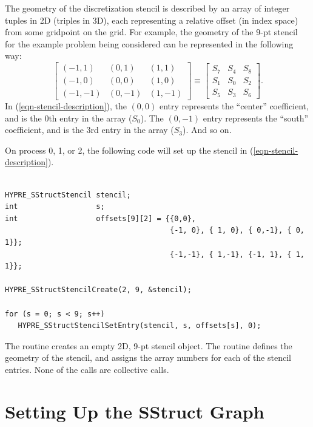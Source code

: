 The geometry of the discretization stencil is described by an array of
integer tuples in 2D (triples in 3D), each representing a relative
offset (in index space) from some gridpoint on the grid.  For example,
the geometry of the 9-pt stencil for the example problem being
considered can be represented in the following way:
\begin{equation}\label{sstruct:eqn-stencil-description}
\left [
\begin{array}{ccc}
(-1, 1) & ( 0, 1) & ( 1, 1) \\
(-1, 0) & ( 0, 0) & ( 1, 0) \\
(-1,-1) & ( 0,-1) & ( 1,-1) 
\end{array}
\right ]
\equiv
\left [
\begin{array}{ccc}
S_7 & S_4 & S_8 \\
S_1 & S_0 & S_2 \\
S_5 & S_3 & S_6
\end{array}
\right ] .
\end{equation}
In (\ref{eqn-stencil-description}), the $(0,0)$ entry represents the
``center'' coefficient, and is the 0th entry in the array ($S_0$).
The $(0,-1)$ entry represents the ``south'' coefficient, and is the
3rd entry in the array ($S_3$).  And so on.

On process 0, 1, or 2, the following code will set up the stencil in
(\ref{eqn-stencil-description}).
\begin{display}
\begin{verbatim}

HYPRE_SStructStencil stencil;
int                  s;
int                  offsets[9][2] = {{0,0},
                                      {-1, 0}, { 1, 0}, { 0,-1}, { 0, 1}};
                                      {-1,-1}, { 1,-1}, {-1, 1}, { 1, 1}};

HYPRE_SStructStencilCreate(2, 9, &stencil);

for (s = 0; s < 9; s++)
   HYPRE_SStructStencilSetEntry(stencil, s, offsets[s], 0);

\end{verbatim}
\end{display}
The  routine creates an empty 2D, 9-pt stencil object.
The  routine defines the geometry of the stencil, and
assigns the array numbers for each of the stencil entries.  None of
the calls are collective calls.


\section{Setting Up the SStruct Graph}
\label{Setting Up the SStruct Graph}

